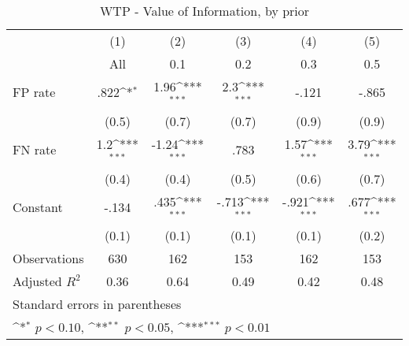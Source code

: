 \begin{table}[htbp]\centering
\def\sym#1{\ifmmode^{#1}\else\(^{#1}\)\fi}
\caption{WTP - Value of Information, by prior}
\begin{tabular}{l*{5}{c}}
\hline\hline
                &\multicolumn{1}{c}{(1)}&\multicolumn{1}{c}{(2)}&\multicolumn{1}{c}{(3)}&\multicolumn{1}{c}{(4)}&\multicolumn{1}{c}{(5)}\\
                &\multicolumn{1}{c}{All}&\multicolumn{1}{c}{0.1}&\multicolumn{1}{c}{0.2}&\multicolumn{1}{c}{0.3}&\multicolumn{1}{c}{0.5}\\
\hline
FP rate         &     .822\sym{*}  &     1.96\sym{***}&      2.3\sym{***}&    -.121         &    -.865         \\
                &    (0.5)         &    (0.7)         &    (0.7)         &    (0.9)         &    (0.9)         \\
FN rate         &      1.2\sym{***}&    -1.24\sym{***}&     .783         &     1.57\sym{***}&     3.79\sym{***}\\
                &    (0.4)         &    (0.4)         &    (0.5)         &    (0.6)         &    (0.7)         \\
Constant        &    -.134         &     .435\sym{***}&    -.713\sym{***}&    -.921\sym{***}&     .677\sym{***}\\
                &    (0.1)         &    (0.1)         &    (0.1)         &    (0.1)         &    (0.2)         \\
\hline
Observations    &      630         &      162         &      153         &      162         &      153         \\
Adjusted \(R^{2}\)&     0.36         &     0.64         &     0.49         &     0.42         &     0.48         \\
\hline\hline
\multicolumn{6}{l}{\footnotesize Standard errors in parentheses}\\
\multicolumn{6}{l}{\footnotesize \sym{*} \(p<0.10\), \sym{**} \(p<0.05\), \sym{***} \(p<0.01\)}\\
\end{tabular}
\end{table}
